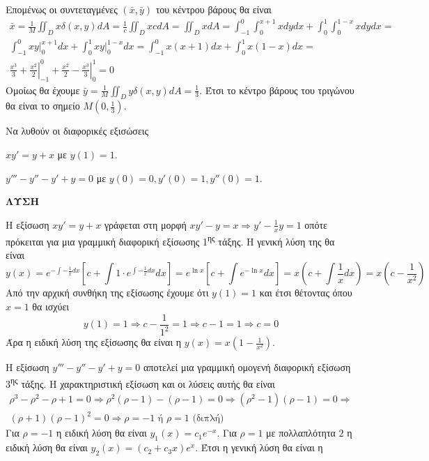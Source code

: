 \documentclass[internet]{diag-xelatex}
\newcommand{\tss}[1]{\textsuperscript{#1}}
\newcommand{\lysh}{\textbf{\textcolor{\xrwma}{ΛΥΣΗ}}}
\begin{document}
\begin{thema}[start=2]
Επομένως οι συντεταγμένες $ \left( \bar{x},\bar{y}\right)  $ του κέντρου βάρους θα είναι 
\begin{gather*}
 \bar{x}=\frac{1}{M}\iint_{D}{x\delta(x,y)dA}=\frac{1}{c}\iint_{D}{xcdA}=\iint_{D}{xdA}=\int_{-1}^{0}\int_{0}^{x+1}{xdydx}+\int_{0}^{1}\int_{0}^{1-x}{xdydx}=\\
\int_{-1}^{0}{\left. xy\right|_{0}^{x+1}dx}+\int_{0}^{1}{\left. xy\right|_{0}^{1-x}dx}=\int_{-1}^{0}{x(x+1)dx}+\int_{0}^{1}{x(1-x)dx}=\\
\left.\frac{x^3}{3}+\frac{x^2}{2} \right|_{-1}^{0}+\left.\frac{x^2}{2}-\frac{x^3}{3} \right|_{0}^{1}=0
\end{gather*}
Ομοίως θα έχουμε $ \bar{y}=\frac{1}{M}\iint_{D}{y\delta(x,y)dA}=\frac{1}{3} $. Έτσι το κέντρο βάρους του τριγώνου θα είναι το σημείο $ M\left( 0,\frac{1}{3}\right)  $.\\
\item Να λυθούν οι διαφορικές εξισώσεις
\begin{rlist}
\item $ xy'=y+x $ με $ y(1)=1 $.
\item $ y'''-y''-y'+y=0 $ με $ y(0)=0,y'(0)=1,y''(0)=1 $.
\end{rlist}
\lysh
\begin{rlist}
\item Η εξίσωση $ xy'=y+x $ γράφεται στη μορφή $ xy'-y=x\Rightarrow y'-\frac{1}{x}y=1 $ οπότε πρόκειται για μια γραμμική διαφορική εξίσωσης 1\tss{ης} τάξης. Η γενική λύση της θα είναι
\[ y(x)=e^{-\int{-\frac{1}{x}dx}}\left[c+\int{1\cdot e^{\int{-\frac{1}{x}dx}}dx} \right]=e^{\ln{x}}\left[c+\int{e^{-\ln{x}}dx} \right]=x\left(c+ \int \frac{1}{x}dx\right)=x\left(c-\frac{1}{x^2} \right)  \]
Από την αρχική συνθήκη της εξίσωσης έχουμε ότι $ y(1)=1 $ και έτσι θέτοντας όπου $ x=1 $ θα ισχύει
\[ y(1)=1\Rightarrow c-\frac{1}{1^2}=1\Rightarrow c-1=1\Rightarrow c=0 \]
Άρα η ειδική λύση της εξίσωσης θα είναι η $ y(x)=x\left(1-\frac{1}{x^2} \right)  $.
\item Η εξίσωση $ y'''-y''-y'+y=0 $ αποτελεί μια γραμμική ομογενή διαφορική εξίσωση 3\tss{ης} τάξης. Η χαρακτηριστική εξίσωση και οι λύσεις αυτής θα είναι 
\begin{gather*}
\rho^3-\rho^2-\rho+1=0\Rightarrow \rho^2(\rho-1)-(\rho-1)=0\Rightarrow \left(\rho^2-1\right)(\rho-1)=0\Rightarrow\\
(\rho+1)(\rho-1)^2=0\Rightarrow \rho=-1\textrm{ ή }\rho=1 \textrm{ (διπλή)}
\end{gather*}
Για $ \rho=-1 $ η ειδική λύση θα είναι $ y_1(x)=c_1e^{-x} $. Για $ \rho=1 $ με πολλαπλότητα $ 2 $ η ειδική λύση θα είναι $ y_2(x)=\left( c_2+c_3x\right) e^{x} $. Έτσι η γενική λύση θα είναι η 

\end{rlist}
\end{thema}
\end{document}
